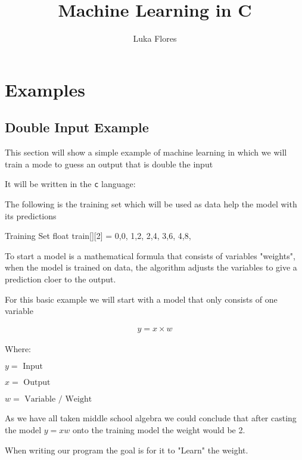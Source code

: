 \documentclass{report}
\title{\Huge{{Machine Learning in C}}}
\author{\huge{Luka Flores}}
\date{}
\begin{document}
\maketitle
\newpage%
\tableofcontents
\pagebreak


\chapter{Examples} %
\label{chap:Examples}


\section{Double Input Example} %
\label{sec:Double Input Example}


This section will show a simple example of machine learning in which we will train a mode to guess an output that is double the input

It will be written in the \verb|c| language: 

The following is the training set which will be used as data help the model with its predictions

\begin{code}[language=c]{Training Set}
float train[][2] = {
    {0,0},
    {1,2},
    {2,4},
    {3,6},
    {4,8},
}
\end{code}


To start a model is a mathematical formula that consists of variables "weights", when the model is trained on data, the algorithm adjusts the variables to give a prediction cloer to the output. 



For this basic example we will start with a model that only consists of one variable


\begin{align*}
    y = x \times w
\end{align*}

Where:

$y = \text{ Input}$

$x = \text{ Output}$

$w = \text{ Variable / Weight}$


As we have all taken middle school algebra we could conclude that after casting the model $y = xw$ onto the training model the weight would be 2.

When writing our program the goal is for it to "Learn" the weight. 
\end{document}
